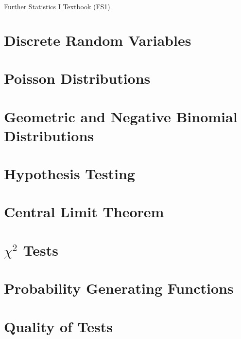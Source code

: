 \href{https://drive.google.com/drive/folders/15jKq0jd-87l-vm9anlj5tpmQ6VRDbtiN}{\hypertarget{book:FS1}{Further Statistics I Textbook (FS1)}}

\section{Discrete Random Variables} \label{}
\newpage
\section{Poisson Distributions} \label{}
\newpage
\section{Geometric and Negative Binomial Distributions} \label{}
\newpage
\section{Hypothesis Testing} \label{}
\newpage
\section{Central Limit Theorem} \label{}
\newpage
\section{\texorpdfstring{$\chi^2$}{\textit{χ}²} Tests} \label{}
\newpage
\section{Probability Generating Functions} \label{}
\newpage
\section{Quality of Tests} \label{}
\newpage
